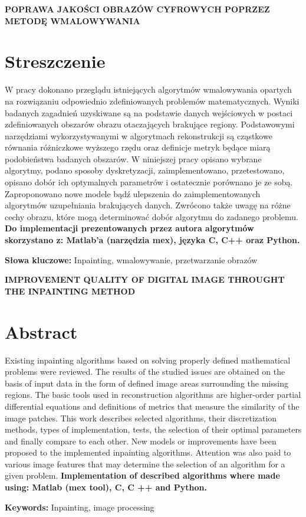 \newpage
\begin{center}
\large \bf
POPRAWA JAKOŚCI OBRAZÓW CYFROWYCH POPRZEZ METODĘ WMALOWYWANIA
\end{center}
\section*{Streszczenie}
W pracy dokonano przeglądu istniejących algorytmów wmalowywania opartych na rozwiązaniu odpowiednio zdefiniowanych problemów matematycznych. Wyniki badanych zagadnień uzyskiwane są na podstawie danych wejściowych w postaci zdefiniowanych obszarów obrazu otaczających brakujące regiony. Podstawowymi narzędziami wykorzystywanymi w algorytmach rekonstrukcji są cząstkowe równania różniczkowe wyższego rzędu oraz definicje metryk będące miarą podobieństwa badanych obszarów. W niniejszej pracy opisano wybrane algorytmy, podano sposoby dyskretyzacji, zaimplementowano, przetestowano, opisano dobór ich optymalnych parametrów i ostatecznie porównano je ze sobą. Zaproponowano nowe modele bądź ulepszenia do zaimplementowanych algorytmów uzupełniania brakujących danych. Zwrócono także uwagę na różne cechy obrazu, które mogą determinować dobór algorytmu do zadanego problemu. \textbf{Do implementacji prezentowanych przez autora algorytmów skorzystano z: Matlab'a (narzędzia mex), języka C, C++ oraz Python.}

\bigskip
{\noindent \bf Słowa kluczowe:} Inpainting, wmalowywanie, przetwarzanie obrazów

\vskip 2cm

\begin{center}
\large \bf
IMPROVEMENT QUALITY OF DIGITAL IMAGE THROUGHT THE INPAINTING METHOD
\end{center}

\section*{Abstract}
Existing inpainting algorithms based on solving properly defined mathematical problems were reviewed. The results of the studied issues are obtained on the basis of input data in the form of defined image areas surrounding the missing regions. The basic tools used in reconstruction algorithms are higher-order partial differential equations and definitions of metrics that measure the similarity of the image patches. This work describes selected algorithms, their discretization methods, types of implementation, tests, the selection of their optimal parameters and finally compare to each other. New models or improvements have been proposed to the implemented inpainting algorithms. Attention was also paid to various image features that may determine the selection of an algorithm for a given problem. \textbf {Implementation of described algorithms where made using: Matlab (mex tool), C, C ++ and Python.}

\bigskip
{\noindent \bf Keywords:} Inpainting, image processing

\vfill